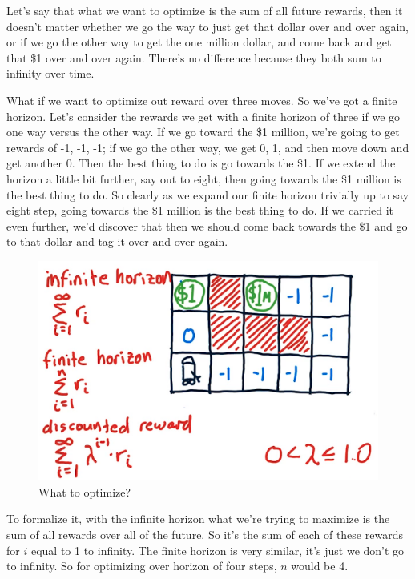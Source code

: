 \documentclass[12pt]{article}
\begin{document}
Let's say that what we want to optimize is the sum of all future rewards, then it doesn't matter whether we go the way to just get that dollar over and over again, or if we go the other way to get the one million dollar, and come back and get that \$1 over and over again. There's no difference because they both sum to infinity over time. 

What if we want to optimize out reward over three moves. So we've got a finite horizon. Let's consider the rewards we get with a finite horizon of three if we go one way versus the other way. If we go toward the \$1 million, we're going to get rewards of -1, -1, -1; if we go the other way, we get 0, 1, and then move down and get another 0. Then the best thing to do is go towards the \$1. If we extend the horizon a little bit further, say out to eight, then going towards the \$1 million is the best thing to do. So clearly as we expand our finite horizon trivially up to say eight step, going towards the \$1 million is the best thing to do. If we carried it even further, we'd discover that then we should come back towards the \$1 and go to that dollar and tag it over and over again. 

\begin{figure}[!ht]
\centering
\includegraphics[scale=0.45]{fig/fig102}
\caption{What to optimize?}
\end{figure}

To formalize it, with the infinite horizon what we're trying to maximize is the sum of all rewards over all of the future. So it's the sum of each of these rewards for $i$ equal to 1 to infinity. The finite horizon is very similar, it's just we don't go to infinity. So for optimizing over horizon of four steps, $n$ would be 4. 
\end{document}
